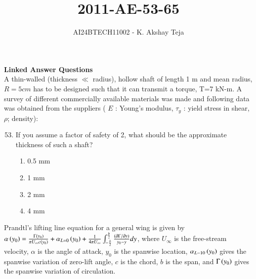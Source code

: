 \documentclass[journal,9pt,onecolumn]{IEEEtran}
\begin{document}

\vspace{3cm}
\title{2011-AE-53-65}
\author{AI24BTECH11002 - K. Akshay Teja}
\maketitle
 \bigskip
{\let\newpage\relax\maketitle}

\renewcommand{\thefigure}{\theenumi}
\renewcommand{\thetable}{\theenumi}
\setlength{\intextsep}{10pt} %

\renewcommand{\thetable}{\theenumi}


\noindent
\textbf{Linked Answer Questions}\\
A thin-walled (thickness $\ll$ radius), hollow shaft of length 1 m and mean radius, $R=5 cm$ has to be designed such that it can transmit a torque, T=7 kN-m. A survey of different commercially available materials was made and following data was obtained from the suppliers ( $E$ : Young's modulus, $\tau_y$ : yield stress in shear, $\rho$; density):\\
\begin{table}[h!]
    \centering
    
    \label{AE-2011}
\end{table}
\begin{enumerate}
\setcounter{enumi}{52}
\item If you assume a factor of safety of 2, what should be the approximate thickness of such a shaft?
   \begin{multicols}{4}
   \begin{enumerate}
       \item 0.5 mm
       \item 1 mm
       \item 2 mm
       \item 4 mm
   \end{enumerate}
   \end{multicols}
\end{enumerate} 
\noindent
Prandtl's lifting line equation for a general wing is given by \\
$\alpha\left(y_0\right)=\frac{\Gamma\left(y_0\right)}{\pi U_{\infty} c\left(y_0\right)}+\alpha_{L=0}\left(y_0\right)+\frac{1}{4 \pi U_{\infty}} \int_{-\frac{b}{2}}^{\frac{b}{2}} \frac{\left(\partial \Gamma / \partial y\right)}{y_0-y} d y$, 
where $U_{\infty}$ is the free-stream velocity, $\alpha$ is the angle of attack, $y_0$ is the spanwise location, $\alpha_{L-10}\left(y_0\right)$ gives the spanwise variation of zero-lift angle, $c$ is the chord, $b$ is the span, and $\Gamma\left(y_0\right)$ gives the spanwise variation of circulation.
\end{document}
